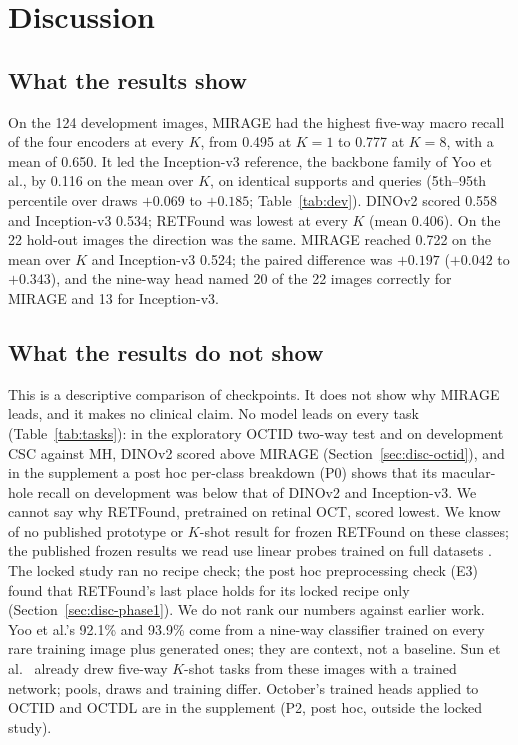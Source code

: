 \documentclass[conference]{IEEEtran}
\begin{document}
\section{Discussion}
\label{sec:discussion}
\subsection{What the results show}
On the 124 development images, MIRAGE had the highest five-way macro recall of the four encoders at every $K$, from 0.495 at $K=1$ to 0.777 at $K=8$, with a mean of 0.650. It led the Inception-v3 reference, the backbone family of Yoo et al., by 0.116 on the mean over $K$, on identical supports and queries (5th--95th percentile over draws $+0.069$ to $+0.185$; Table~\ref{tab:dev}). DINOv2 scored 0.558 and Inception-v3 0.534; RETFound was lowest at every $K$ (mean 0.406).
On the 22 hold-out images the direction was the same. MIRAGE reached 0.722 on the mean over $K$ and Inception-v3 0.524; the paired difference was $+0.197$ ($+0.042$ to $+0.343$), and the nine-way head named 20 of the 22 images correctly for MIRAGE and 13 for Inception-v3.

\subsection{What the results do not show}
This is a descriptive comparison of checkpoints. It does not show why MIRAGE leads, and it makes no clinical claim. No model leads on every task (Table~\ref{tab:tasks}): in the exploratory OCTID two-way test and on development CSC against MH, DINOv2 scored above MIRAGE (Section~\ref{sec:disc-octid}), and in the supplement a post hoc per-class breakdown (P0) shows that its macular-hole recall on development was below that of DINOv2 and Inception-v3.
We cannot say why RETFound, pretrained on retinal OCT, scored lowest. We know of no published prototype or $K$-shot result for frozen RETFound on these classes; the published frozen results we read use linear probes trained on full datasets \cite{MIRAGE2025}. The locked study ran no recipe check; the post hoc preprocessing check (E3) found that RETFound's last place holds for its locked recipe only (Section~\ref{sec:disc-phase1}).
We do not rank our numbers against earlier work. Yoo et al.'s 92.1\% and 93.9\% come from a nine-way classifier trained on every rare training image plus generated ones; they are context, not a baseline. Sun et al.\ \cite{Sun2024} already drew five-way $K$-shot tasks from these images with a trained network; pools, draws and training differ. October's trained heads applied to OCTID and OCTDL are in the supplement (P2, post hoc, outside the locked study).
\end{document}
